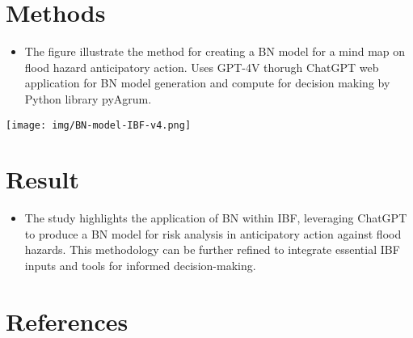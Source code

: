 \documentclass[a0paper,fleqn]{betterposter}
\begin{document}
{		\section{Methods}
		\begin{itemize}
			\item The figure illustrate the method for creating a BN model for a mind map on flood hazard anticipatory action. Uses  GPT-4V\cite{openai2023gpt4} thorugh ChatGPT web application for BN model generation and compute for decision making by Python library pyAgrum\cite{hal-03135721}.
		\end{itemize}
		\begin{center}
			\texttt{[image: img/BN-model-IBF-v4.png]}
			\label{fig1}
		\end{center}
		
		
	    \section{Result}
		\begin{itemize}
			\item The study highlights the application of BN within IBF, leveraging ChatGPT to produce a BN model for risk analysis in anticipatory action against flood hazards. This methodology can be further refined to integrate essential IBF inputs and tools for informed decision-making.
		\end{itemize}
		\section{References}
		\renewcommand{\bibsection}{}                                                                                                               
		
		
	}	
\end{document}
